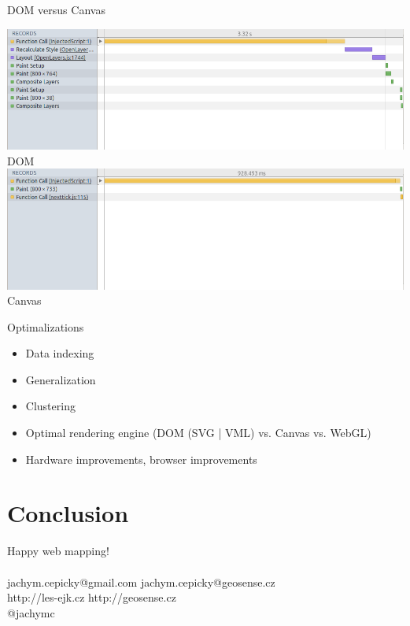 \documentclass[xcolor=dvipsnames]{beamer}
\begin{document}
\begin{frame}{DOM versus Canvas}
    \begin{center}
    \includegraphics[width=\textwidth]{images/dom.png}\\
    DOM
    \\
    \includegraphics[width=\textwidth]{images/canvas.png}\\
    Canvas
    \end{center}
\end{frame}

\begin{frame}{Optimalizations}
\begin{itemize}[<+->]
    \item Data indexing
    \item Generalization
    \item Clustering
    \item Optimal rendering engine (DOM (SVG | VML) vs. Canvas vs. WebGL)
    \item Hardware improvements, browser improvements
\end{itemize}
\end{frame}


\section*{Conclusion}
\begin{frame}
    Happy web mapping!\\
    ~
    \\
    jachym.cepicky@gmail.com jachym.cepicky@geosense.cz\\
    http://les-ejk.cz http://geosense.cz\\
    @jachymc
\end{frame}
\end{document}
